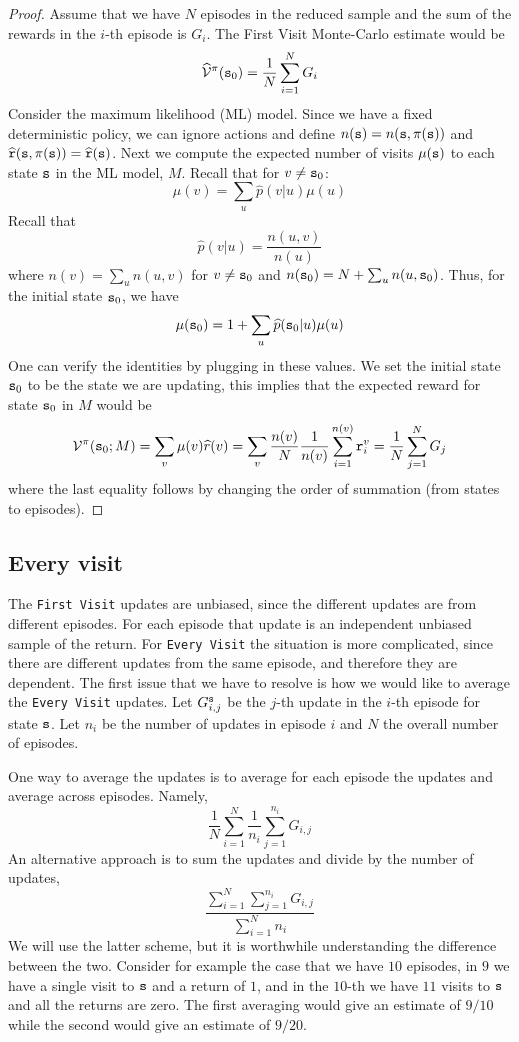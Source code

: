 \begin{proof}
Assume that we have $N$ episodes in the reduced sample and the sum
of the rewards in the $i$-th episode is $G_i$. The First Visit Monte-Carlo
estimate would be
\[\widehat{\mathcal{V}}^\pi({\tt s}_0)=\frac{1}{N}\sum_{i=1}^N G_i\]
Consider the maximum likelihood (ML) model. Since we have a fixed
deterministic policy, we can ignore actions and define
$n({\tt s})=n({\tt s},\pi({\tt s}))$ and
$\widehat{{\tt r}}({\tt s},\pi({\tt s}))=\widehat{{\tt r}}({\tt s})$.
Next we compute the expected number of visits $\mu({\tt s})$ to
each state ${\tt s}$ in the ML model, $M$.
Recall that for $v\neq {\tt s}_0$:
\[
\mu(v)=\sum_u \widehat{p}(v|u)\mu(u)
\]
Recall that \[\widehat{p}(v|u)=\frac{n(u,v)}{n(u)}\] 
where $n(v)=\sum_u n(u,v)$ for $v\neq {\tt s}_0$ and
$n({\tt s}_0)=N+\sum_u n(u,{\tt s}_0)$.
Thus, for the initial state ${\tt s}_{0}$, we have
\[
\mu({\tt s}_0)=1+ \sum_u \widehat{p}({\tt s}_0|u)\mu(u)
\]
One can verify the identities by
plugging in these values.
We set the initial state ${\tt s}_0$ to be the state we are updating,
this implies that the expected reward for
state ${\tt s}_0$ in $M$ would be
\[
\mathcal{V}^\pi({\tt s}_0;M)=\sum_v \mu(v) \widehat{r}(v)=\sum_v
\frac{n(v)}{N}\frac{1}{n(v)}\sum_{i=1}^{n(v)} {\tt r}_i^v =
\frac{1}{N}\sum_{j=1}^N G_j
\]
where the last equality follows by changing the order of summation
(from states to episodes).


\end{proof}

\subsection{Every visit}

The {\tt First Visit} updates are unbiased, since the different
updates are from different episodes. For each episode that update is
an independent unbiased sample of the return.
%
For {\tt Every Visit} the situation is more complicated, since there
are different updates from the same episode, and therefore they are
dependent. The first issue that we have to resolve is how we would like
to average the {\tt Every Visit} updates. Let $G^{\tt s}_{i,j}$
be the $j$-th update in the $i$-th episode for state ${\tt s}$. Let
$n_i$ be the number of updates in episode $i$ and $N$ the overall
number of episodes.

One way to average the updates is to average for each episode the
updates and average across episodes. Namely,
\[
\frac{1}{N}\sum_{i=1}^N \frac{1}{n_i} \sum_{j=1}^{n_i} G_{i,j}
\]
An alternative approach is to sum the updates and divide by the
number of updates,
\[
\frac{\sum_{i=1}^N\sum_{j=1}^{n_i} G_{i,j}}{\sum_{i=1}^N n_i}
\]
We will use the latter scheme, but it is worthwhile understanding
the difference between the two. Consider for example the case that
we have $10$ episodes, in $9$ we have a single visit to ${\tt s}$ and
a return of $1$, and in the $10$-th we have $11$ visits to ${\tt s}$
and all the returns are zero. The first averaging would give an
estimate of $9/10$ while the second would give an estimate of
$9/20$.

